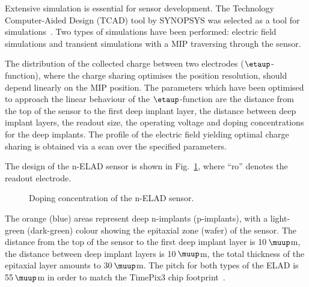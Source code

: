 \documentclass[a4paper,11pt]{article}
\begin{document}
Extensive simulation is essential for sensor development. 
The Technology Computer-Aided Design (TCAD) tool by SYNOPSYS was selected as a tool for simulations~\cite{syn}.
Two types of simulations have been performed: electric field simulations and transient simulations with a MIP traversing through the sensor.

The distribution of the collected charge between two electrodes ($\etaup$-function), where the charge sharing optimises the position resolution, should depend linearly on the MIP position. 
The parameters which have been optimised to approach the linear behaviour of the $\etaup$-function are the distance from the top of the sensor to the first deep implant layer, the distance between deep implant layers, the readout size, the operating voltage and doping concentrations for the deep implants. 
The profile of the electric field yielding optimal charge sharing is obtained via a scan over the specified parameters.

The design of the n-ELAD sensor is shown in Fig.~\ref{fig:geom}, where ``ro'' denotes the readout electrode.
\begin{figure}[t]
\begin{center}
\caption{Doping concentration of the n-ELAD sensor.}
\label{fig:geom}
\end{center}
\end{figure}
The orange (blue) areas represent deep n-implants (p-implants), with a light-green (dark-green) colour showing the epitaxial zone (wafer) of the sensor. 
The distance from the top of the sensor to the first deep implant layer is 10\,$\muup$m, the distance between deep implant layers is 10\,$\muup$m, the total thickness of the epitaxial layer amounts to 30\,$\muup$m.
The pitch for both types of the ELAD is 55\,$\muup$m in order to match the TimePix3 chip footprint~\cite{tp3}.
\end{document}
